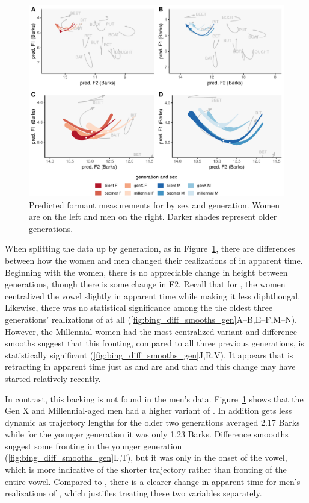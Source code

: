 \begin{figure}[tb!]
	\centering
	\includegraphics[width = 6.5in]{Figures/BING/BING_four_panel_plot.pdf}
	\caption[Predicted formant measurements for \bing by sex and generation.]{Predicted formant measurements for \bing by sex and generation. Women are on the left and men on the right. Darker shades represent older generations.}
	\label{fig:BING_four_panel}
\end{figure}

When splitting the data up by generation, as in Figure~\ref{fig:BING_four_panel}, there are differences between how the women and men changed their realizations of \bing in apparent time. Beginning with the women, there is no appreciable change in height between generations, though there is some change in F2. Recall that for \bin, the women centralized the vowel slightly in apparent time while making it less diphthongal. Likewise, there was no statistical significance among the the oldest three generations' realizations of \bing at all (\ref{fig:bing_diff_smooths_gen}A--B,E--F,M--N). However, the Millennial women had the most centralized variant and difference smooths suggest that this fronting, compared to all three previous generations, is statistically significant (\ref{fig:bing_diff_smooths_gen}J,R,V). It appears that \bing is retracting in apparent time just as \bin and \bit are and that and this change may have started relatively recently.

In contrast, this backing is not found in the men's data. Figure~\ref{fig:BING_four_panel} shows that the Gen X and Millennial-aged men had a higher variant of \bing. In addition \bing gets less dynamic as trajectory lengths for the older two generations averaged 2.17 Barks while for the younger generation it was only 1.23 Barks. Difference smoooths suggest some fronting in the younger generation (\ref{fig:bing_diff_smooths_gen}L,T), but it was only in the onset of the vowel, which is more indicative of the shorter trajectory rather than fronting of the entire vowel. Compared to \bin, there is a clearer change in apparent time for men's realizations of \bing, which justifies treating these two variables separately.

